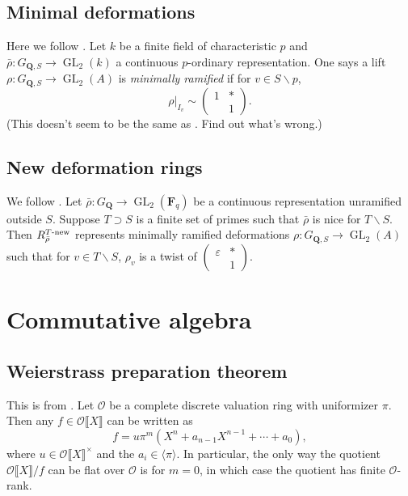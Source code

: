 \documentclass{amsart}
\DeclareMathOperator{\GL}{GL}
\newcommand{\cO}{\mathcal{O}}
\newcommand{\dF}{\mathbf{F}}
\newcommand{\dQ}{\mathbf{Q}}
\begin{document}
\subsection{Minimal deformations}

Here we follow \cite[\S2.1]{khare-2003}. Let $k$ be a finite field of 
characteristic $p$ and $\bar\rho:G_{\dQ,S}\to \GL_2(k)$ a continuous 
$p$-ordinary representation. One says a lift $\rho:G_{\dQ,S}\to \GL_2(A)$ is 
\emph{minimally ramified} if for $v\in S\smallsetminus p$, 
\[
  \rho|_{I_v}\sim \begin{pmatrix} 1 & \ast \\ & 1 \end{pmatrix} .
\]
\textsf{(This doesn't seem to be the same as 
\cite[p.180]{khare-ramakrishna-2003}. Find out what's wrong.)}


\subsection{New deformation rings}

We follow \cite[df.1]{khare-ramakrishna-2003}. 
Let $\bar\rho:G_\dQ\to \GL_2(\dF_q)$ be a continuous representation unramified 
outside $S$. Suppose $T\supset S$ is a finite set of primes such that 
$\bar\rho$ is nice for $T\smallsetminus S$. Then 
$R_{\bar\rho}^{T\textnormal{-new}}$ represents minimally ramified deformations 
$\rho:G_{\dQ,S} \to \GL_2(A)$ such that for $v\in T\smallsetminus S$, 
$\rho_v$ is a twist of $\begin{pmatrix} \varepsilon & \ast \\ & 1 \end{pmatrix}$. 





\section{Commutative algebra}


\subsection{Weierstrass preparation theorem}

This is from \cite[VII \S 3.8, pr.6]{bourbaki-comm-alg}. Let $\cO$ be a 
complete discrete valuation ring with uniformizer $\pi$. Then any 
$f\in \cO\llbracket X\rrbracket$ can be written as 
\[
  f = u \pi^m \left(X^n+a_{n-1} X^{n-1} + \cdots + a_0\right),
\]
where $u\in \cO\llbracket X\rrbracket^\times$ and the 
$a_i\in \langle \pi\rangle$. In particular, the only way the quotient 
$\cO\llbracket X\rrbracket/f$ can be flat over $\cO$ is for 
$m=0$, in which case the quotient has finite $\cO$-rank. 







\end{document}
